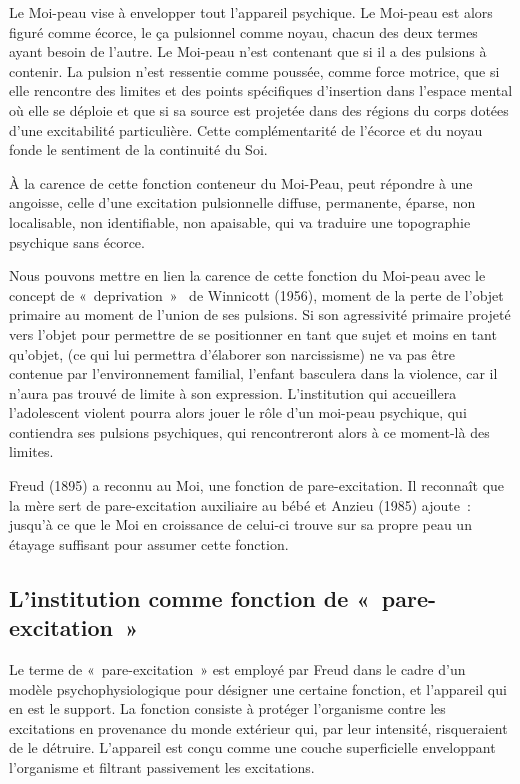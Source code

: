 \documentclass[12pt, a4paper]{book}
\begin{document}
\begin{spacing}{1.5}
Le Moi-peau vise à envelopper tout l'appareil psychique. Le Moi-peau est alors figuré comme écorce, le ça pulsionnel comme noyau, chacun des deux termes ayant besoin de l'autre. Le Moi-peau n'est contenant que si il a des pulsions à contenir. La pulsion n'est ressentie comme poussée, comme force motrice, que si elle rencontre des limites et des points spécifiques d'insertion dans l'espace mental où elle se déploie et que si sa source est projetée dans des régions du corps dotées d'une excitabilité particulière. Cette complémentarité de l'écorce et du noyau fonde le sentiment de la continuité du Soi.

À la carence de cette fonction conteneur du Moi-Peau, peut répondre à une angoisse, celle d'une excitation pulsionnelle diffuse, permanente, éparse, non localisable, non identifiable, non apaisable, qui va traduire une topographie psychique sans écorce.

Nous pouvons mettre en lien la carence de cette fonction du Moi-peau avec le concept de « deprivation »  de Winnicott (1956), moment de la perte de l'objet primaire au moment de l'union de ses pulsions. Si son agressivité primaire projeté vers l'objet pour permettre de se positionner en tant que sujet et moins en tant qu'objet, (ce qui lui permettra d'élaborer son narcissisme) ne va pas être contenue par l'environnement familial, l'enfant basculera dans la violence, car il n'aura pas trouvé de limite à son expression. L'institution qui accueillera l'adolescent violent pourra alors jouer le rôle d'un moi-peau psychique, qui contiendra ses pulsions psychiques, qui rencontreront alors à ce moment-là des limites.

Freud (1895) a reconnu au Moi, une fonction de pare-excitation. Il reconnaît que la mère sert de pare-excitation auxiliaire au bébé et Anzieu (1985) ajoute : jusqu'à ce que le Moi en croissance de celui-ci trouve sur sa propre peau un étayage suffisant pour assumer cette fonction.

\subsection{L'institution comme fonction de « pare-excitation~»}

Le terme de « pare-excitation » est employé par Freud dans le cadre d'un modèle psychophysiologique pour désigner une certaine fonction, et l'appareil qui en est le support. La fonction consiste à protéger l'organisme contre les excitations en provenance du monde extérieur qui, par leur intensité, risqueraient de le détruire. L'appareil est conçu comme une couche superficielle enveloppant l'organisme et filtrant passivement les excitations.


\end{spacing}
\end{document}
